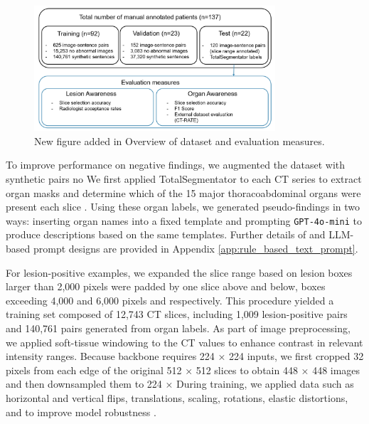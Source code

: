 \documentclass[bioengineering,article,submit,pdftex,moreauthors]{Definitions/mdpi}
\begin{document}
\begin{figure}[ht]
  \centering
  \includegraphics[width=0.8\textwidth]{./figures/dataset_detail_1.png}
  \caption{
    New figure added in  Overview of dataset  and evaluation measures.
  }
  \label{fig:dataset_detail}
\end{figure}


To improve performance on negative findings, we augmented the dataset with synthetic  pairs  no  
We first applied TotalSegmentator to each CT series to extract organ masks and determine which of the 15 major thoracoabdominal organs were present  each slice \cite{wasserthal_totalsegmentator_2023}. 
Using these organ labels, we generated pseudo-findings in two ways:  inserting organ names into a fixed template and  prompting \texttt{GPT-4o-mini} to produce  descriptions based on the same templates. 
Further details of   and LLM-based prompt designs are provided in Appendix \ref{app:rule_based_text_prompt}.


For lesion-positive examples, we expanded the slice range based on lesion   boxes larger than 2,000 pixels were padded by one slice above and below,  boxes exceeding 4,000 and 6,000 pixels   and   respectively. 
This procedure yielded a training set composed of 12,743 CT slices, including 1,009 lesion-positive  pairs and 140,761  pairs generated from organ labels.
As part of image preprocessing, we applied soft-tissue windowing to the CT values to enhance contrast in relevant intensity ranges. 
Because  backbone requires 224 × 224 inputs, we first cropped 32 pixels from each edge of the original 512 × 512 slices to obtain 448 × 448 images and then downsampled them to 224 ×  
During training, we applied data  such as horizontal and vertical flips, translations, scaling, rotations, elastic distortions, and  to improve model robustness \cite{devries_improved_2017}.
\end{document}
